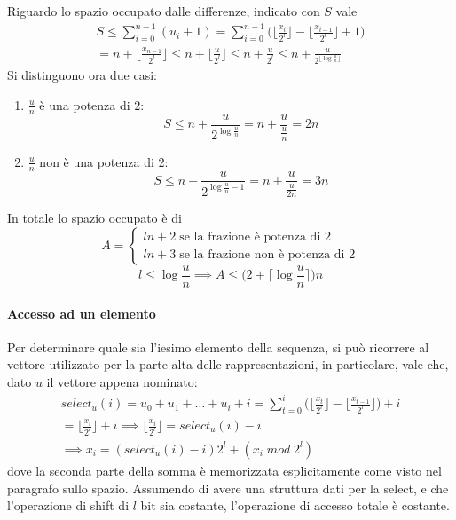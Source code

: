 Riguardo lo spazio occupato dalle differenze, indicato con $S$ vale
\begin{equation}
    \begin{aligned}
        S \leq \sum_{i=0}^{n-1} ( u_i + 1) = \sum_{i=0}^{n-1} \bigg( \bigg\lfloor \frac{x_i}{2^l} 
        \bigg\rfloor -\bigg\lfloor \frac{x_{i-1}}{2^l} \bigg\rfloor  + 1\bigg) \\=
        n + \bigg\lfloor \frac{x_{n-1}}{2^l} \bigg\rfloor \leq n + \bigg\lfloor \frac{u}{2^l} \bigg\rfloor
        \leq n + \frac{u}{2^l} \leq n + \frac{u}{2^{\lfloor\log \frac{u}{n}\rfloor}}
    \end{aligned}
\end{equation}
Si distinguono ora due casi:
\begin{enumerate}
    \item $\frac{u}{n}$ è una potenza di 2:
        $$S \leq n + \frac{u}{2^{\log \frac{u}{n}}} = n + \frac{u}{\frac{u}{n}} = 2n$$
    \item $\frac{u}{n}$ non è una potenza di 2:
         $$S \leq n + \frac{u}{2^{\log \frac{u}{n} -1}} = n + \frac{u}{\frac{u}{2n}} = 3n$$
\end{enumerate}
In totale lo spazio occupato è di
\[A =\begin{cases}
    ln +2\;\text{se la frazione è potenza di 2}\\
    ln + 3\;\text{se la frazione non è potenza di 2}
\end{cases}\]
$$l \leq \log\frac{u}{n} \implies 
A \leq \bigg( 2 + \bigg\lceil \log \frac{u}{n}\bigg\rceil\bigg)n$$

\paragraph{Accesso ad un elemento}
Per determinare quale sia l'iesimo elemento della sequenza, 
si può ricorrere al vettore utilizzato per la parte alta delle rappresentazioni, 
in particolare, vale che, dato $u$ il vettore appena nominato: 
\begin{equation}
    \begin{aligned}
        \mathit{select}_u(i) = u_0 + u_1 + \dots + u_i + i 
        = \sum_{t=0}^i \bigg(\bigg\lfloor \frac{x_t}{2^l}\bigg\rfloor - 
        \bigg\lfloor \frac{x_{t-1}}{2^l}\bigg\rfloor \bigg) + i \\= 
        \bigg\lfloor \frac{x_i}{2^l}\bigg\rfloor + i \implies 
        \bigg\lfloor \frac{x_i}{2^l}\bigg\rfloor =  \mathit{select}_u(i) - i\\
        \implies x_i = (\mathit{select}_u(i) - i)2^l + (x_i \; \mathit{mod}\;2^l)
    \end{aligned}
\end{equation}
dove la seconda parte della somma è memorizzata esplicitamente come visto nel paragrafo 
sullo spazio. Assumendo di avere una struttura dati per la select, e che l'operazione 
di shift di $l$ bit sia costante, l'operazione di accesso totale è costante.

